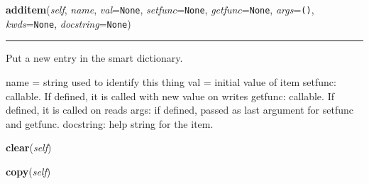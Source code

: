     \begin{boxedminipage}{\textwidth}

    \raggedright \textbf{additem}(\textit{self}, \textit{name}, \textit{val}=\texttt{None}, \textit{setfunc}=\texttt{None}, \textit{getfunc}=\texttt{None}, \textit{args}=\texttt{()}, \textit{kwds}=\texttt{None}, \textit{docstring}=\texttt{None})

    \vspace{-1.5ex}

    \rule{\textwidth}{0.5\fboxrule}
    Put a new entry in the smart dictionary.

    name = string used to identify this thing val = initial value of item 
    setfunc: callable. If defined, it is called with new value on writes 
    getfunc: callable. If defined, it is called on reads args: if defined, 
    passed as last argument for setfunc and getfunc. docstring: help string
    for the item.

    \vspace{1ex}

    \end{boxedminipage}

    \label{DataDict:DataDict:clear}

    \vspace{0.5ex}

    \begin{boxedminipage}{\textwidth}

    \raggedright \textbf{clear}(\textit{self})

    \end{boxedminipage}

    \label{DataDict:DataDict:copy}

    \vspace{0.5ex}

    \begin{boxedminipage}{\textwidth}

    \raggedright \textbf{copy}(\textit{self})

    \end{boxedminipage}

    \label{DataDict:DataDict:get}

    \vspace{0.5ex}

